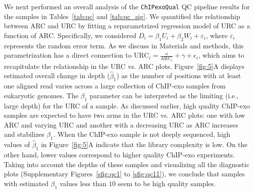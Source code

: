 \documentclass{bmcart}
\newcommand{\pname}[1]{\texttt{ChIPexoQual}}
\begin{document}
We next performed an overall analysis of the \pname{} QC pipeline
results for the samples in Tables~\ref{tab:qc} and \ref{tab:qc_sig}.
We quantified the relationship between ARC and URC by fitting a
reparametrized regression model of URC as a function of ARC.
Specifically, we considered $D_i = \beta_1 U_i +\beta_2 W_i
+\varepsilon_i$, where $\varepsilon_i$ represents the random error
term.  As we discuss in Materials and methods, this parametrization
has a direct connection to $\mbox{URC}_i = \frac{\kappa}{\mbox{ARC}_i}
+ \gamma+ \epsilon_i$, which aims to recapitulate the relationship in
the URC vs. ARC plots.
Figure~\ref{fig:5}A displays estimated overall change in depth
($\hat{\beta}_1$) as the number of positions with at least one aligned
read varies across a large collection of ChIP-exo samples from
eukaryotic genomes. The $\beta_1$ parameter can be interpreted as the
limiting (i.e., large depth) for the URC of a sample.
As discussed earlier, high quality ChIP-exo samples are expected to
have two arms in the URC vs. ARC plots: one with low ARC and varying
URC and another with a decreasing URC as ARC increases and stabilizes
$\beta_1$. When the ChIP-exo sample is not deeply sequenced, high
values of $\hat{\beta}_1$ in Figure~\ref{fig:5}A indicate that the
library complexity is low. On the other hand, lower values correspond
to higher quality ChIP-exo experiments. Taking into account the depths
of these samples and visualizing all the diagnostic plots
(Supplementary Figures~\ref{sfig:qc1} to \ref{sfig:qc11}), we conclude
that samples with estimated $\beta_1$ values less than $10$ seem to be
high quality samples.
\end{document}

